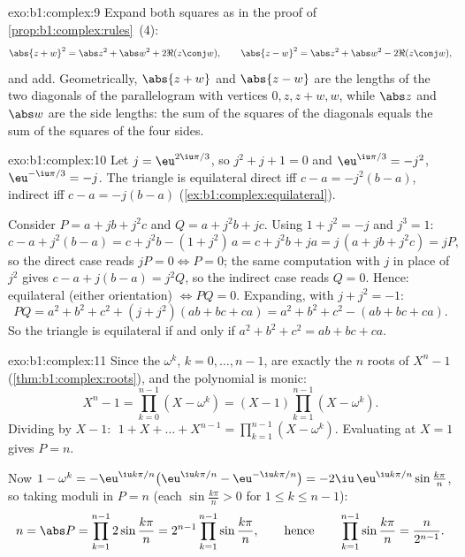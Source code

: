\begin{solution}{exo:b1:complex:9}
Expand both squares as in the proof of
\cref{prop:b1:complex:rules}~(4):
\[
\abs{z + w}^2 = \abs z^2 + \abs w^2 + 2\Re(z\conj w),
\qquad
\abs{z - w}^2 = \abs z^2 + \abs w^2 - 2\Re(z\conj w),
\]
and add. Geometrically, $\abs{z+w}$ and $\abs{z-w}$ are the lengths of
the two diagonals of the parallelogram with vertices $0, z, z+w, w$,
while $\abs z$ and $\abs w$ are the side lengths: the sum of the
squares of the diagonals equals the sum of the squares of the four
sides.
\end{solution}

\begin{solution}{exo:b1:complex:10}
Let $j = \eu^{2\iu\pi/3}$, so $j^2 + j + 1 = 0$ and $\eu^{\iu\pi/3} =
-j^2$, $\eu^{-\iu\pi/3} = -j$. The triangle is equilateral direct iff
$c - a = -j^2 (b - a)$, indirect iff $c - a = -j(b - a)$
(\cref{ex:b1:complex:equilateral}).

Consider $P = a + jb + j^2 c$ and $Q = a + j^2 b + jc$. Using $1 +
j^2 = -j$ and $j^3 = 1$:
\[
c - a + j^2(b - a) = c + j^2 b - (1 + j^2)\,a = c + j^2 b + ja
= j\,(a + jb + j^2 c) = jP,
\]
so the direct case reads $jP = 0 \iff P = 0$; the same computation
with $j$ in place of $j^2$ gives $c - a + j(b - a) = j^2 Q$, so the
indirect case reads $Q = 0$. Hence: equilateral (either orientation)
$\iff PQ = 0$. Expanding, with $j + j^2 = -1$:
\[
PQ = a^2 + b^2 + c^2 + (j + j^2)(ab + bc + ca)
= a^2 + b^2 + c^2 - (ab + bc + ca).
\]
So the triangle is equilateral if and only if $a^2 + b^2 + c^2 = ab +
bc + ca$.
\end{solution}

\begin{solution}{exo:b1:complex:11}
Since the $\omega^k$, $k = 0, \dots, n-1$, are exactly the $n$ roots
of $X^n - 1$ (\cref{thm:b1:complex:roots}), and the polynomial is
monic:
\[
X^n - 1 = \prod_{k=0}^{n-1} (X - \omega^k)
= (X - 1) \prod_{k=1}^{n-1} (X - \omega^k).
\]
Dividing by $X - 1$: $\;1 + X + \dots + X^{n-1} = \prod_{k=1}^{n-1}
(X - \omega^k)$. Evaluating at $X = 1$ gives $P = n$.

Now $1 - \omega^k = -\eu^{\iu k\pi/n}\bigl(\eu^{\iu k\pi/n} -
\eu^{-\iu k\pi/n}\bigr) = -2\iu\,\eu^{\iu k\pi/n} \sin\frac{k\pi}{n}$,
so taking moduli in $P = n$ (each $\sin\frac{k\pi}n > 0$ for $1 \leq k
\leq n-1$):
\[
n = \abs P = \prod_{k=1}^{n-1} 2\sin\frac{k\pi}{n}
= 2^{n-1} \prod_{k=1}^{n-1} \sin\frac{k\pi}{n},
\qquad\text{hence}\qquad
\prod_{k=1}^{n-1} \sin\frac{k\pi}{n} = \frac{n}{2^{n-1}} .
\]
\end{solution}

